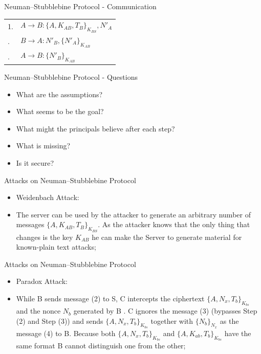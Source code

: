 \documentclass[12pt,table,xcolor={dvipsnames}]{beamer}
\begin{document}
\begin{frame}{Neuman–Stubblebine Protocol - Communication}
\begin{table}[htdp]
\begin{center}
\begin{tabular}{ l l }
1. & $A\rightarrow B: \{A,K_{AB},T_{B}\}_{K_{BS}},N'_{A}$ \\\pause
2. & $B\rightarrow A: N'_{B},\{N'_{A}\}_{K_{AB}}$ \\\pause
3. & $A\rightarrow B: \{N'_{B}\}_{K_{AB}}$ 
\end{tabular}
\end{center}
\end{table}%
\end{frame}


\begin{frame}{Neuman–Stubblebine Protocol - Questions}
\begin{itemize}
\item What are the assumptions? \pause
\item What seems to be the goal?\pause 
\item What might the principals believe after each step?\pause
\item What is missing?\pause
\item Is it secure?
\end{itemize}
\end{frame}

\begin{frame}{Attacks on Neuman–Stubblebine Protocol}
\begin{itemize}
\item Weidenbach Attack:
\item The server can be used by the attacker to generate an arbitrary number of messages $\{A,K_{AB},T_{B}\}_{K_{BS}}$. As the attacker knows that the only thing that changes is the key $K_{AB}$ he can make the Server to generate material for known-plain text attacks;
\end{itemize}
\end{frame}

\begin{frame}{Attacks on Neuman–Stubblebine Protocol}
\begin{itemize}
\item Paradox Attack:
\item While B sends message (2) to S, C intercepts the ciphertext $\{A, N_x, T_b\}_{K_{bs}}$ and the nonce $N_b$ generated by B . C ignores the message (3) (bypasses Step (2) and Step (3)) and sends $\{A, N_x, T_b\}_{K_{bs}}$ together with $\{N_b\}_{N_x}$ as the message (4) to B. Because both $\{A, N_x, T_b\}_{K_{bs}}$ and $\{A, K_{ab}, T_b \}_{K_{bs}}$ have the same format  B cannot distinguish one from the other;
\end{itemize}
\end{frame}
\end{document}

